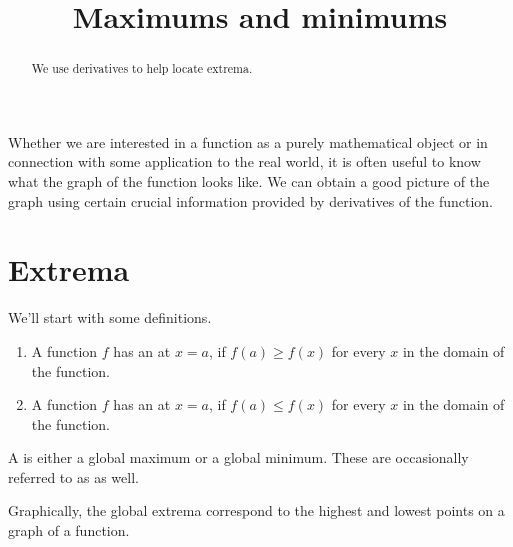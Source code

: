 \documentclass{ximera}
\title[Dig-In:]{Maximums and minimums}
\begin{document}
\begin{abstract}
We use derivatives to help locate extrema.  
\end{abstract}
\maketitle


Whether we are interested in a function as a purely mathematical
object or in connection with some application to the real world, it is
often useful to know what the graph of the function looks like. We can
obtain a good picture of the graph using certain crucial information
provided by derivatives of the function.

\section{Extrema}
We'll start with some definitions.
\begin{definition}\hfil{}
	\begin{enumerate}
		\item A function $f$ has an  at $x=a$, 
			if $f(a) \geq f(x)$ for every $x$ in the domain of the function.
		\item A function $f$ has an  at $x=a$, 
			if $f(a) \leq f(x)$ for every $x$ in the domain of the function.
	\end{enumerate} 
	A  is either a global maximum or a global minimum.
	These are occasionally referred to as  as well.
\end{definition}

Graphically, the global extrema correspond to the highest and lowest points on a graph of a function.
\end{document}
